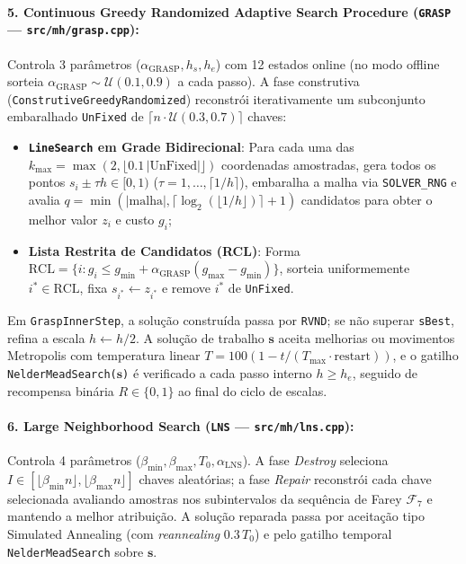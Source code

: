 \documentclass[11pt,a4paper]{article}
\begin{document}
\paragraph{5. Continuous Greedy Randomized Adaptive Search Procedure (\texttt{GRASP} --- \texttt{src/mh/grasp.cpp}):}
Controla 3 parâmetros ($\alpha_{\text{GRASP}}, h_s, h_e$) com 12 estados online (no modo offline sorteia $\alpha_{\text{GRASP}} \sim \mathcal{U}(0.1, 0.9)$ a cada passo). A fase construtiva (\texttt{ConstrutiveGreedyRandomized}) reconstrói iterativamente um subconjunto embaralhado \texttt{UnFixed} de $\lceil n \cdot \mathcal{U}(0.3, 0.7) \rceil$ chaves:
\begin{itemize}[leftmargin=*]
  \item \textbf{\texttt{LineSearch} em Grade Bidirecional}: Para cada uma das $k_{\max} = \max(2, \lfloor 0.1\,|\text{UnFixed}| \rfloor)$ coordenadas amostradas, gera todos os pontos $s_i \pm \tau h \in [0, 1)$ ($\tau = 1, \dots, \lceil 1/h \rceil$), embaralha a malha via \texttt{SOLVER\_RNG} e avalia $q = \min(|\text{malha}|, \lceil \log_2(\lfloor 1/h \rfloor) \rceil + 1)$ candidatos para obter o melhor valor $z_i$ e custo $g_i$;
  \item \textbf{Lista Restrita de Candidatos (RCL)}: Forma $\text{RCL} = \{i : g_i \le g_{\min} + \alpha_{\text{GRASP}}(g_{\max} - g_{\min})\}$, sorteia uniformemente $i^* \in \text{RCL}$, fixa $s_{i^*} \leftarrow z_{i^*}$ e remove $i^*$ de \texttt{UnFixed}.
\end{itemize}
Em \texttt{GraspInnerStep}, a solução construída passa por \texttt{RVND}; se não superar \texttt{sBest}, refina a escala $h \leftarrow h/2$. A solução de trabalho $\mathbf{s}$ aceita melhorias ou movimentos Metropolis com temperatura linear $T = 100(1 - t/(T_{\max}\cdot\text{restart}))$, e o gatilho \texttt{NelderMeadSearch($\mathbf{s}$)} é verificado a cada passo interno $h \ge h_e$, seguido de recompensa binária $R \in \{0, 1\}$ ao final do ciclo de escalas.

\paragraph{6. Large Neighborhood Search (\texttt{LNS} --- \texttt{src/mh/lns.cpp}):}
Controla 4 parâmetros ($\beta_{\min}, \beta_{\max}, T_0, \alpha_{\text{LNS}}$). A fase \emph{Destroy} seleciona $I \in [\lfloor \beta_{\min} n \rfloor, \lfloor \beta_{\max} n \rfloor]$ chaves aleatórias; a fase \emph{Repair} reconstrói cada chave selecionada avaliando amostras nos subintervalos da sequência de Farey $\mathcal{F}_7$ e mantendo a melhor atribuição. A solução reparada passa por aceitação tipo Simulated Annealing (com \emph{reannealing} $0.3\,T_0$) e pelo gatilho temporal \texttt{NelderMeadSearch} sobre $\mathbf{s}$.
\end{document}
